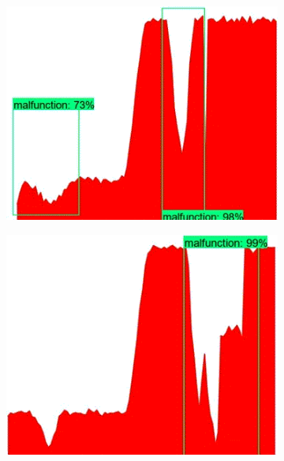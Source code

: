 \documentclass[french]{article}
\theoremstyle{mytheoremstyle}
\theoremstyle{mytheoremstyle}
\theoremstyle{myproblemstyle}
\begin{document}
    \begin{figure}[H]
    \centering
    \begin{subfigure}[t]{0.3\textwidth}
            \centering
            \includegraphics[width=1\textwidth]{images/od_1.png}
    \end{subfigure}%
    \begin{subfigure}[t]{0.3\textwidth}
            \centering
            \includegraphics[width=1\textwidth]{images/od_2.png}
    \end{subfigure}
    \begin{subfigure}[t]{0.3\textwidth}
            \centering

\end{subfigure}
\end{figure}
\end{document}
